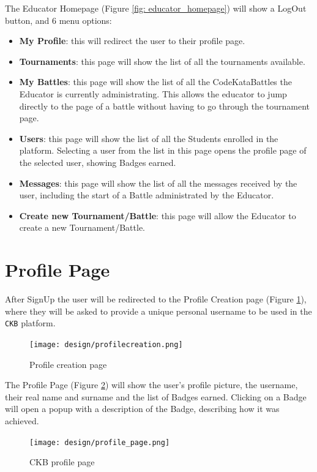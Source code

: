 The Educator Homepage (Figure \ref{fig: educator_homepage}) will show a LogOut button, and 6 menu options:
\begin{itemize}
    \item \textbf{My Profile}: this will redirect the user to their profile page.
    \item \textbf{Tournaments}: this page will show the list of all the tournaments available.
    \item \textbf{My Battles}: this page will show the list of all the CodeKataBattles the Educator is currently administrating. This allows the educator to 
    jump directly to the page of a battle without having to go through the tournament page.
    \item \textbf{Users}: this page will show the list of all the Students enrolled in the platform. 
    Selecting a user from the list in this page opens the profile page of the selected user, showing Badges earned.
    \item \textbf{Messages}: this page will show the list of all the messages received by the user, including the start of a Battle administrated by the Educator. 
    \item \textbf{Create new Tournament/Battle}: this page will allow the Educator to create a new Tournament/Battle.
\end{itemize}

\newpage
\section{Profile Page}
\label{sec: profile_page}%
After SignUp  the user will be redirected to the Profile Creation page (Figure \ref{fig: profilecreation}), 
where they will be asked to provide a unique personal username to be used in the \verb|CKB| platform.
\begin{figure} [H]
    \begin{center}
        \texttt{[image: design/profilecreation.png]}
        \caption{Profile creation page}
        \label{fig: profilecreation}
    \end{center}
\end{figure}

The Profile Page (Figure \ref{fig: prof_page}) will show the user's profile picture, the username, their real name and surname and the list of Badges earned.
Clicking on a Badge will open a popup with a description of the Badge, describing how it was achieved.
\begin{figure} [H]
    \begin{center}
        \texttt{[image: design/profile\_page.png]}
        \caption{CKB profile page}
        \label{fig: prof_page}
    \end{center}
\end{figure}






